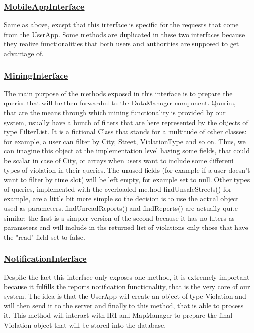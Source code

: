 		\subsubsection[MobileAppInterface]{\hyperlink{toc}{MobileAppInterface}}
			Same as above, except that this interface is specific for the requests that come from the UserApp. Some methods are duplicated in these two interfaces because they realize functionalities that both users and authorities are supposed to get advantage of.
			
		\subsubsection[MiningInterface]{\hyperlink{toc}{MiningInterface}}
			The main purpose of the methods exposed in this interface is to prepare the queries that will be then forwarded to the DataManager component. Queries, that are the means through which mining functionality is provided by our system, usually have a bunch of filters that are here represented by the objects of type FilterList. It is a fictional Class that stands for a multitude of other classes: for example, a user can filter by City, Street, ViolationType and so on. Thus, we can imagine this object at the implementation level having some fields, that could be scalar in case of City, or arrays when users want to include some different types of violation in their queries. The unused fields (for example if a user doesn't want to filter by time slot) will be left empty, for example set to null. Other types of queries, implemented with the overloaded method findUnsafeStreets() for example, are a little bit more simple so the decision is to use the actual object used as parameters. findUnreadReports() and findReports() are actually quite similar: the first is a simpler version of the second because it has no filters as parameters and will include in the returned list of violations only those that have the "read" field set to false. 
		
		\subsubsection[NotificationInterface]{\hyperlink{toc}{NotificationInterface}}
			Despite the fact this interface only exposes one method, it is extremely important because it fulfills the reports notification functionality, that is the very core of our system. The idea is that the UserApp will create an object of type Violation and will then send it to the server and finally to this method, that is able to process it. This method will interact with IRI and MapManager to prepare the final Violation object that will be stored into the database.
		
